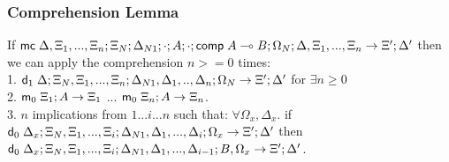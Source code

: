 \subsubsection{Comprehension Lemma}

If $\mathsf{mc} \; \Delta, \Xi_1, ..., \Xi_n; \Xi_N; \Delta_{N1}; \cdot; A; \cdot; \mathsf{comp} \; A \multimap B; \Omega_N; \Delta, \Xi_1, ..., \Xi_n \rightarrow \Xi'; \Delta'$ then we can apply the comprehension $n >= 0$ times: \\
1. \hspace{1cm} $\mathsf{d}_1 \; \Delta; \Xi_N, \Xi_1, ..., \Xi_n; \Delta_{N1}, \Delta_1, .., \Delta_n; \Omega_N \rightarrow \Xi'; \Delta'$ for $\exists n \geq 0$\\
2. \hspace{1cm} $\mathsf{m}_0 \; \Xi_1; A \rightarrow \Xi_1$ ... $\mathsf{m}_0 \; \Xi_n; A \rightarrow \Xi_n$.\\
3. \hspace{1cm} $n$ implications from $1 ... i ... n$ such that: $\forall \Omega_x, \Delta_x.$ if $\mathsf{d}_0 \; \Delta_x; \Xi_N, \Xi_1, ..., \Xi_i; \Delta_{N1}, \Delta_1, ..., \Delta_i; \Omega_x \rightarrow \Xi'; \Delta'$ then $\mathsf{d}_0 \; \Delta_x; \Xi_N, \Xi_1, ..., \Xi_i; \Delta_{N1}, \Delta_1, ..., \Delta_{i-1}; B, \Omega_x \rightarrow \Xi'; \Delta'$.

